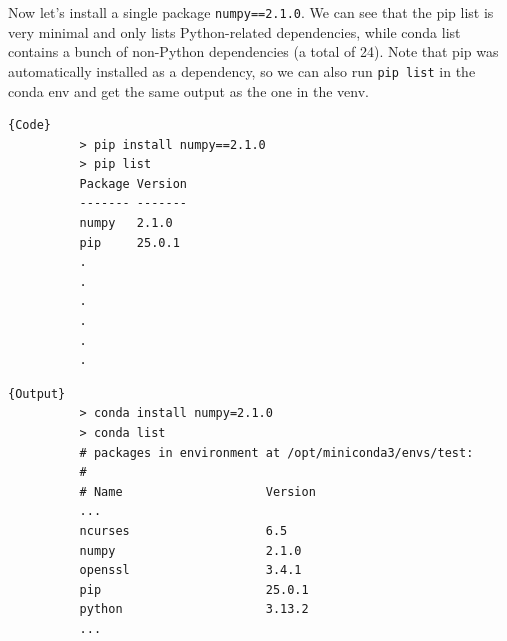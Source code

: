 \documentclass{article}
\begin{document}
    \begin{example}
      Now let's install a single package \texttt{numpy==2.1.0}. We can see that the pip list is very minimal and only lists Python-related dependencies, while conda list contains a bunch of non-Python dependencies (a total of 24). Note that pip was automatically installed as a dependency, so we can also run \texttt{pip list} in the conda env and get the same output as the one in the venv.  
      
      \noindent\begin{minipage}{.35\textwidth}
        \begin{lstlisting}[]{Code} 
          > pip install numpy==2.1.0
          > pip list
          Package Version
          ------- -------
          numpy   2.1.0
          pip     25.0.1
          .
          .
          .
          .
          .
          .
        \end{lstlisting}
        \end{minipage}
        \hfill
        \begin{minipage}{.64\textwidth}
        \begin{lstlisting}[]{Output}
          > conda install numpy=2.1.0
          > conda list
          # packages in environment at /opt/miniconda3/envs/test:
          #
          # Name                    Version      
          ...
          ncurses                   6.5         
          numpy                     2.1.0       
          openssl                   3.4.1       
          pip                       25.0.1      
          python                    3.13.2      
          ...
        \end{lstlisting}
      \end{minipage}
    \end{example}
\end{document}
